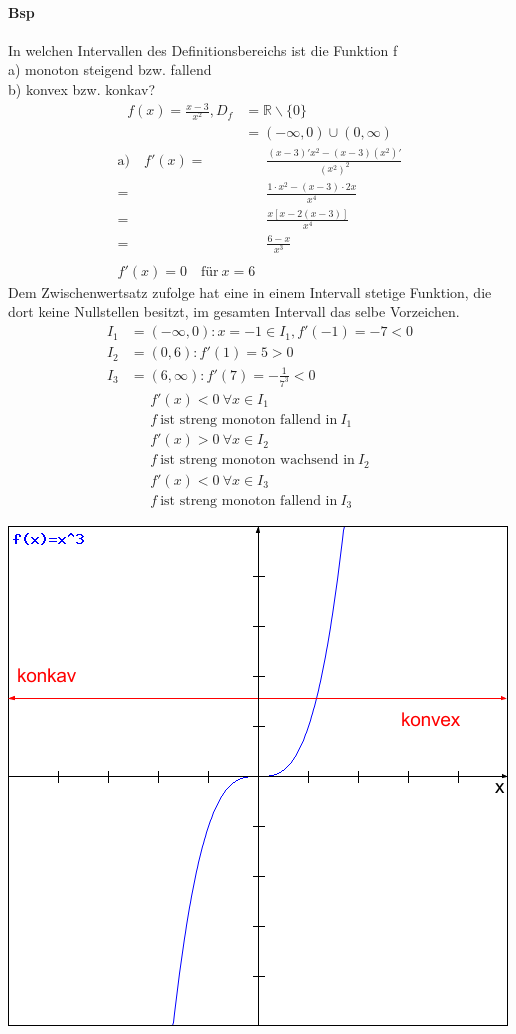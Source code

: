 \documentclass{article}
\begin{document}
\paragraph{Bsp} 
In welchen Intervallen des Definitionsbereichs ist die Funktion f
\\
a) \quad monoton steigend bzw. fallend \\
b) \quad konvex bzw. konkav?
\begin{align*}
	f(x)=\frac{x-3}{x^2}, D_f&=\mathbb{R} \backslash\{0\}
	\\
	&=(-\infty, 0)\cup(0,\infty)
\end{align*}
\begin{align*}
	\text{a)} \quad f'(x)=&\frac{(x-3)'x^2-(x-3)(x^2)'}{(x^2)^2}
	\\
	=&\frac{1 \cdot{x^2}-(x-3) \cdot{2x}}{x^4}
	\\
	=&\frac{x[x-2(x-3)]}{x^4}
	\\
	=&\frac{6-x}{x^3}
	\\
	\\
	f'(x) = 0 \quad \text{f\"ur} \ x = 6  
\end{align*}
Dem Zwischenwertsatz zufolge hat eine in einem Intervall stetige Funktion,
die dort keine Nullstellen besitzt, im gesamten Intervall das selbe Vorzeichen.
\begin{align*}
	I_1&=(-\infty,0):x=-1 \in I_1,f'(-1)=-7 < 0
	\\
	I_2&=(0,6):f'(1)=5 > 0
	\\
	I_3&=(6,\infty):f'(7)=-\frac{1}{7^3} < 0	
\end{align*}
\begin{align*}
	f'(x) < 0 \ \forall x \in I_1
	\\
	f \ \text{ist streng monoton fallend in} \ I_1
	\\	
	f'(x) > 0 \ \forall x \in I_2
	\\
	f \ \text{ist streng monoton wachsend in} \ I_2
	\\	
	f'(x) < 0 \ \forall x \in I_3
	\\
	f \ \text{ist streng monoton fallend in} \ I_3
\end{align*}
\begin{center}
	\includegraphics[scale=0.5]{png/konkav_konvex.png}
\end{center}
\end{document}
